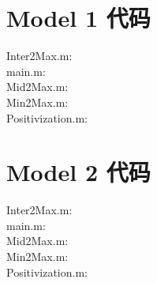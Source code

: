 \documentclass[
  journal=,
  manuscript=,
  year=2022,
  volume=01,
]{cup-journal}
\begin{document}
\printbibliography

\appendix

\section{Model 1 代码}
\noindent Inter2Max.m:\\

\noindent main.m:\\

\noindent Mid2Max.m:\\

\noindent Min2Max.m:\\

\noindent Positivization.m:\\


\section{Model 2 代码}
\noindent Inter2Max.m:\\

\noindent main.m:\\

\noindent Mid2Max.m:\\

\noindent Min2Max.m:\\

\noindent Positivization.m:\\

\end{document}
